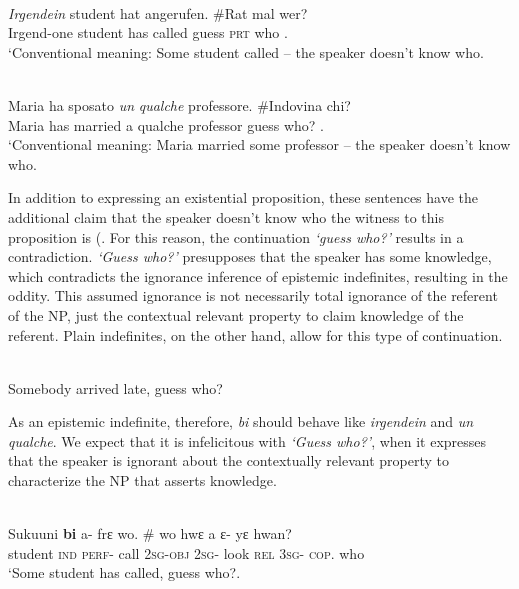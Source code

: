 \documentclass[output=paper,modfonts,nonflat,draftmode]{langsci/langscibook}
\begin{document}
\ea\label{owusu:ex26}\\
 \gll\emph{Irgendein} student hat angerufen. \#Rat mal wer?  \\
     Irgend-one student has called guess \textsc{prt} who .\\
\glt `Conventional meaning: Some student called – the speaker doesn’t know who.

\ex \label{owusu:ex28}\\
\gll Maria ha sposato \emph{un} \emph{qualche} professore. \#Indovina chi? \\
      Maria has married a qualche professor guess who? .\\
\glt `Conventional meaning: Maria married some professor – the speaker doesn’t know who.
\z 

In addition to expressing an existential proposition, these sentences have the additional claim that the speaker doesn't know who the witness to this proposition is (\citet{AloniPort2015}. For this reason, the continuation \emph{`guess who?'} results in a contradiction. \emph{`Guess who?'} presupposes that the speaker has some knowledge, which contradicts the ignorance inference of epistemic indefinites, resulting in the oddity.  This assumed ignorance is not necessarily total ignorance of the referent of the NP,  just the contextual relevant property to claim knowledge of the referent. Plain indefinites, on the other hand, allow for this type of continuation.

  \ea\label{owusu:ex26:2}\\
 Somebody arrived late, guess who?
 \z 
 
 As an epistemic indefinite, therefore, \emph{bi} should behave like \emph{irgendein} and \emph{un qualche}. We expect that it is infelicitous with \emph{`Guess who?'}, when it expresses that the speaker is ignorant about the contextually relevant property to characterize the NP that asserts knowledge.  


\ea {}\\
 \ea\label{owusu:ex30}
 \gll Sukuuni \textbf{bi} a- frε wo. \# wo hwε a ε- yε hwan? \\
     student \textsc{ind} \textsc{perf}- call       \textsc{2sg}-\textsc{obj} {} \textsc{2sg}- look  \textsc{rel} \textsc{3sg}- \textsc{cop}. who \\
\glt `Some student has called, guess who?.
\end{document}
